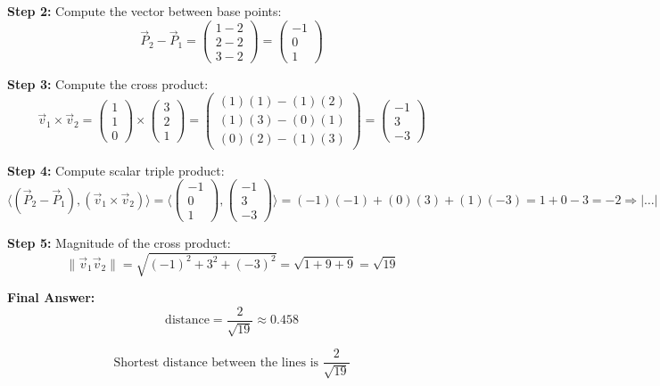 \textbf{Step 2:} Compute the vector between base points:
\[
	\vec{P}_2 - \vec{P}_1 = \begin{pmatrix} 1 - 2 \\ 2 - 2 \\ 3 - 2 \end{pmatrix} = \begin{pmatrix} -1 \\ 0 \\ 1 \end{pmatrix}
\]

\textbf{Step 3:} Compute the cross product:
\[
	\vec{v}_1 \times \vec{v}_2 =
	\begin{pmatrix} 1 \\ 1 \\ 0 \end{pmatrix} \times \begin{pmatrix} 3 \\ 2 \\ 1 \end{pmatrix}
	= \begin{pmatrix}
		(1)(1) - (1)(2) \\
		(1)(3) - (0)(1) \\
		(0)(2) - (1)(3)
	\end{pmatrix}
	= \begin{pmatrix}
		-1 \\ 3 \\ -3
	\end{pmatrix}
\]

\textbf{Step 4:} Compute scalar triple product:
\[
	\langle(\vec{P}_2 - \vec{P}_1), (\vec{v}_1 \times \vec{v}_2)\rangle =
	\langle\begin{pmatrix} -1 \\ 0 \\ 1 \end{pmatrix}, \begin{pmatrix} -1 \\ 3 \\ -3 \end{pmatrix}\rangle
	= (-1)(-1) + (0)(3) + (1)(-3) = 1 + 0 - 3 = -2
	\Rightarrow |\dots| = 2
\]

\textbf{Step 5:} Magnitude of the cross product:
\[
	\|\vec{v}_1  \vec{v}_2\|= \sqrt{(-1)^2 + 3^2 + (-3)^2} = \sqrt{1 + 9 + 9} = \sqrt{19}
\]

\textbf{Final Answer:}
\[
	\text{distance} = \frac{2}{\sqrt{19}} \approx 0.458
\]

\[
	\boxed{\text{Shortest distance between the lines is } \frac{2}{\sqrt{19}}}
\]

